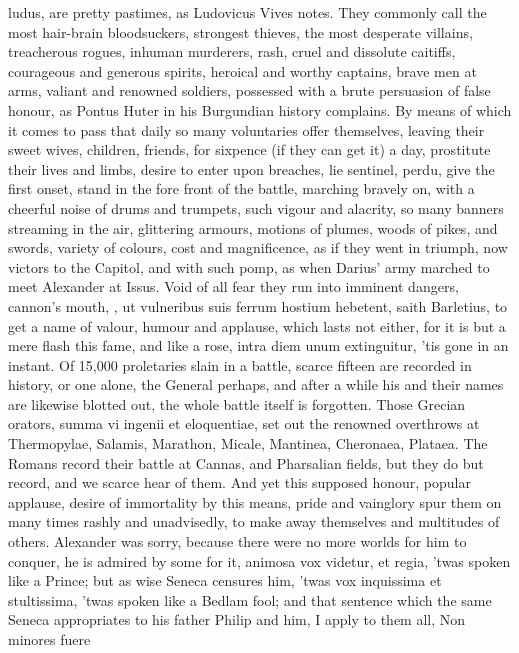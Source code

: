 {ludus, are pretty pastimes, as Ludovicus Vives notes. They
commonly call the most hair-brain bloodsuckers, strongest thieves, the
most desperate villains, treacherous rogues, inhuman murderers, rash,
cruel and dissolute caitiffs, courageous and generous spirits, heroical
and worthy captains, brave men at arms, valiant and renowned
soldiers, possessed with a brute persuasion of false honour, as Pontus
Huter in his Burgundian history complains. By means of which it comes
to pass that daily so many voluntaries offer themselves, leaving their
sweet wives, children, friends, for sixpence (if they can get it) a
day, prostitute their lives and limbs, desire to enter upon breaches,
lie sentinel, perdu, give the first onset, stand in the fore front of
the battle, marching bravely on, with a cheerful noise of drums and
trumpets, such vigour and alacrity, so many banners streaming in the
air, glittering armours, motions of plumes, woods of pikes, and swords,
variety of colours, cost and magnificence, as if they went in triumph,
now victors to the Capitol, and with such pomp, as when Darius' army
marched to meet Alexander at Issus. Void of all fear they run into
imminent dangers, cannon's mouth, \etc{}, ut vulneribus suis ferrum
hostium hebetent, saith Barletius, to get a name of valour, humour
and applause, which lasts not either, for it is but a mere flash this
fame, and like a rose, intra diem unum extinguitur, 'tis gone in an
instant. Of 15,000 proletaries slain in a battle, scarce fifteen are
recorded in history, or one alone, the General perhaps, and after a
while his and their names are likewise blotted out, the whole battle
itself is forgotten. Those Grecian orators, summa vi ingenii et
eloquentiae, set out the renowned overthrows at Thermopylae, Salamis,
Marathon, Micale, Mantinea, Cheronaea, Plataea. The Romans record their
battle at Cannas, and Pharsalian fields, but they do but record, and we
scarce hear of them. And yet this supposed honour, popular applause,
desire of immortality by this means, pride and vainglory spur them on
many times rashly and unadvisedly, to make away themselves and
multitudes of others. Alexander was sorry, because there were no more
worlds for him to conquer, he is admired by some for it, animosa vox
videtur, et regia, 'twas spoken like a Prince; but as wise Seneca
censures him, 'twas vox inquissima et stultissima, 'twas spoken like a
Bedlam fool; and that sentence which the same Seneca appropriates
to his father Philip and him, I apply to them all, Non minores fuere
}
